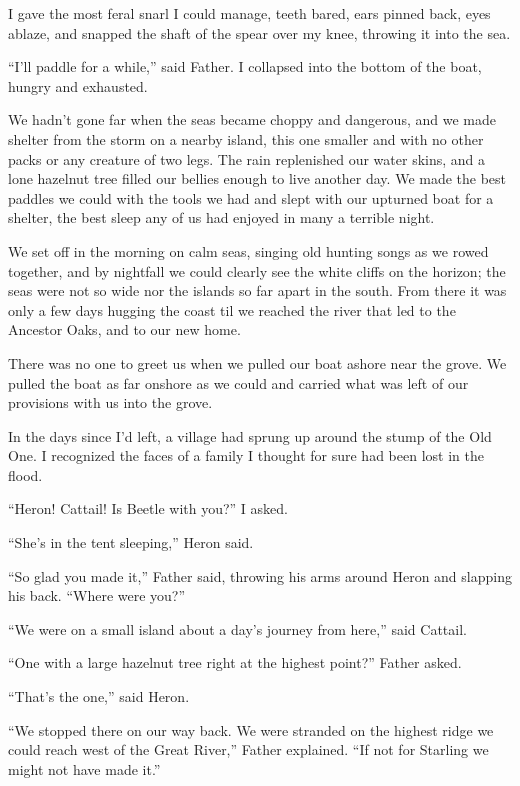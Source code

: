 I gave the most feral snarl I could manage, teeth bared, ears pinned back, eyes ablaze, and snapped the shaft of the spear over my knee, throwing it into the sea.

``I'll paddle for a while,'' said Father. I collapsed into the bottom of the boat, hungry and exhausted.

\secdiv

\noindent We hadn't gone far when the seas became choppy and dangerous, and we made shelter from the storm on a nearby island, this one smaller and with no other packs or any creature of two legs. The rain replenished our water skins, and a lone hazelnut tree filled our bellies enough to live another day. We made the best paddles we could with the tools we had and slept with our upturned boat for a shelter, the best sleep any of us had enjoyed in many a terrible night.

We set off in the morning on calm seas, singing old hunting songs as we rowed together, and by nightfall we could clearly see the white cliffs on the horizon; the seas were not so wide nor the islands so far apart in the south. From there it was only a few days hugging the coast til we reached the river that led to the Ancestor Oaks, and to our new home.

There was no one to greet us when we pulled our boat ashore near the grove. We pulled the boat as far onshore as we could and carried what was left of our provisions with us into the grove.

In the days since I'd left, a village had sprung up around the stump of the Old One. I recognized the faces of a family I thought for sure had been lost in the flood.

``Heron! Cattail! Is Beetle with you?'' I asked.

``She's in the tent sleeping,'' Heron said.

``So glad you made it,'' Father said, throwing his arms around Heron and slapping his back. ``Where were you?''

``We were on a small island about a day's journey from here,'' said Cattail.

``One with a large hazelnut tree right at the highest point?'' Father asked.

``That's the one,'' said Heron.

``We stopped there on our way back. We were stranded on the highest ridge we could reach west of the Great River,'' Father explained. ``If not for Starling we might not have made it.''

